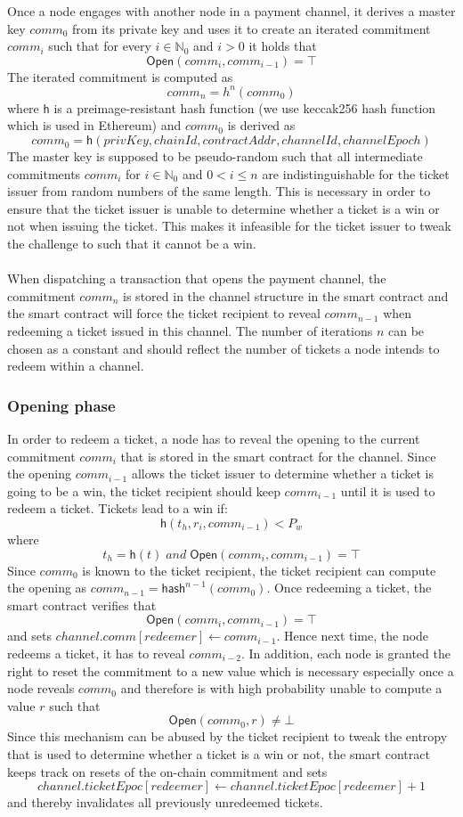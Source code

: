 Once a node engages with another node in a payment channel, it derives a master key $comm_0$ from its private key and uses it to create an iterated commitment $comm_i$ such that for every $i \in \mathbb{N}_0$ and $i > 0$ it holds that $$ \mathsf{Open}(comm_{i}, comm_{i-1}) = \top $$
The iterated commitment is computed as $$comm_n = h^n(comm_0)$$ where $\mathsf{h}$ is a preimage-resistant hash function (we use keccak256 hash function which is used in Ethereum) and $comm_0$ is derived as 
$$ comm_0 = \mathsf{h}(privKey, chainId, contractAddr, channelId, channelEpoch)$$
The master key is supposed to be pseudo-random such that all intermediate commitments $comm_{i}$ for $i \in \mathbb{N}_0$ and $0 < i \le n$ are indistinguishable for the ticket issuer from random numbers of the same length. This is necessary in order to ensure that the ticket issuer is unable to determine whether a ticket is a win or not when issuing the ticket. This makes it infeasible for the ticket issuer to tweak the challenge to such that it cannot be a win.
\\~\\When dispatching a transaction that opens the payment channel, the commitment $comm_n$ is stored in the channel structure in the smart contract and the smart contract will force the ticket recipient to reveal $comm_{n-1}$ when redeeming a ticket issued in this channel.
The number of iterations $n$ can be chosen as a constant and should reflect the number of tickets a node intends to redeem within a channel.

\subsubsection{Opening phase}

In order to redeem a ticket, a node has to reveal the opening to the current commitment $comm_i$ that is stored in the smart contract for the channel. Since the opening $comm_{i-1}$ allows the ticket issuer to determine whether a ticket is going to be a win, the ticket recipient should keep $comm_{i-1}$ until it is used to redeem a ticket.
Tickets lead to a win if: $$\mathsf{h}( t_h, r_i, comm_{i-1} ) < P_w$$ where $$t_h=\mathsf{h}(t) \;and\; \mathsf{Open}(comm_i, comm_{i-1}) = \top$$ Since $comm_{0}$ is known to the ticket recipient, the ticket recipient can compute the opening as $comm_{n-1} = \mathsf{hash}^{n-1}(comm_0)$.
Once redeeming a ticket, the smart contract verifies that $$\mathsf{Open}(comm_i, comm_{i-1}) = \top$$ and sets $channel.comm[redeemer] \leftarrow comm_{i-1}$. Hence next time, the node redeems a ticket, it has to reveal $comm_{i-2}$.
In addition, each node is granted the right to reset the commitment to a new value which is necessary especially once a node reveals $comm_0$ and therefore is with high probability unable to compute a value $r$ such that $$\mathsf{Open}(comm_0,r) \neq \bot$$
Since this mechanism can be abused by the ticket recipient to tweak the entropy that is used to determine whether a ticket is a win or not, the smart contract keeps track on resets of the on-chain commitment and sets $$channel.ticketEpoc[redeemer] \leftarrow channel.ticketEpoc[redeemer] + 1$$ and thereby invalidates all previously unredeemed tickets.


